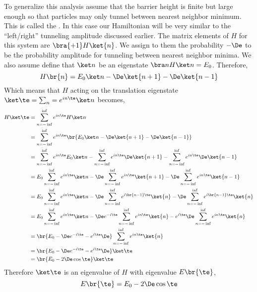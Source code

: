 \documentclass{article}
\begin{document}
To generalize this analysis assume that the barrier height is finite but large enough so that particles may only tunnel between nearest neighbor minimum. This is called the . In this case our Hamiltonian will be very similar to the ``left/right'' tunneling amplitude discussed earlier. The matrix elements of $H$ for this system are $\bra{+1} H \ket{n}$. We assign to them the probability $- \De$ to be the probability amplitude for tunneling between nearest neighbor minima. We also assume define that $\ket n$ be an eigenstate $\bra n H \ket n = E_0$. Therefore,
\[H\br{n} = E_0 \ket n - \De \ket {n+1} - \De \ket{n-1} \]
Which means that $H$ acting on the translation eigenstate $\ket \te  = \sum_n = e^{i n \te} \ket n$ becomes,
\begin{align*}
H\ket \te
&= \sum_{n=-\inf}^{\inf} e^{i n \te} H \ket n \\
&= \sum_{n=-\inf}^{\inf} e^{i n \te} \br{E_0 \ket n - \De \ket {n+1} - \De \ket{n-1}} \\
&= \sum_{n=-\inf}^{\inf} e^{i n \te} E_0 \ket n - \sum_{n=-\inf}^{\inf} e^{i n \te} \De \ket {n+1} - \sum_{n=-\inf}^{\inf} e^{i n \te} \De \ket{n-1} \\
&= E_0\sum_{n=-\inf}^{\inf} e^{i n \te} \ket n - \De\sum_{n=-\inf}^{\inf} e^{i n \te} \ket {n+1} - \De\sum_{n=-\inf}^{\inf} e^{i n \te} \ket{n-1} \\
&= E_0\sum_{n=-\inf}^{\inf} e^{i n \te} \ket n - \De\sum_{n=-\inf}^{\inf} e^{i \br{n-1} \te} \ket {n} - \De\sum_{n=-\inf}^{\inf} e^{i \br{n-1} \te} \ket{n} \\
&= E_0\sum_{n=-\inf}^{\inf} e^{i n \te} \ket n - \De e^{-i \te}\sum_{n=-\inf}^{\inf} e^{i n \te} \ket {n} - e^{i \te}\De\sum_{n=-\inf}^{\inf} e^{i n \te} \ket{n} \\
&= \br{E_0 - \De e^{-i \te} - e^{i \te}\De}\sum_{n=-\inf}^{\inf} e^{i n \te} \ket{n} \\
&= \br{E_0 - \De e^{-i \te} - e^{i \te}\De}\ket \te \\
&= \br{E_0 - 2 \De \cos \te}\ket \te
\end{align*}
Therefore $\ket \te$ is an eigenvalue of $H$ with eigenvalue $E\br{\te}$,
\[ E\br{\te} = E_0 - 2 \De \cos \te \]
\end{document}
